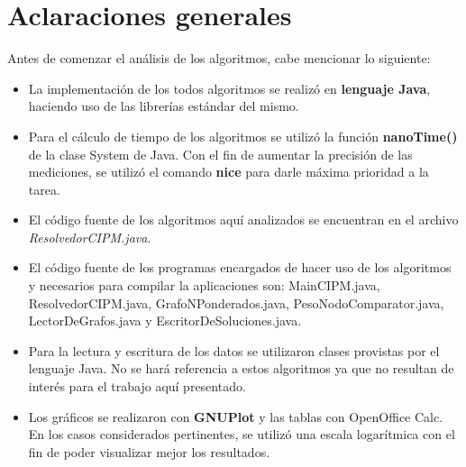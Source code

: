 \documentclass[a4paper,11pt] {article}
\begin{document}
\grupo{}

\maketitle

\bigskip
\section*{Aclaraciones generales}

Antes de comenzar el an\'alisis de los algoritmos, cabe mencionar lo siguiente:

\begin{itemize}
 \item La implementaci\'on de los todos algoritmos se realiz\'o en \textbf{lenguaje Java}, haciendo uso de las librer\'ias est\'andar del mismo.
 \item Para el c\'alculo de tiempo de los algoritmos se utiliz\'o la funci\'on \textbf{nanoTime()} de la clase System de Java. Con el fin de aumentar la precisi\'on de las mediciones, se utiliz\'o el comando \textbf{nice} para darle m\'axima prioridad a la tarea.
 \item El c\'odigo fuente de los algoritmos aqu\'i analizados se encuentran en el archivo \textit{ResolvedorCIPM.java}.
 \item El c\'odigo fuente de los programas encargados de hacer uso de los algoritmos y necesarios para compilar la aplicaciones son: MainCIPM.java, ResolvedorCIPM.java, GrafoNPonderados.java, PesoNodoComparator.java, LectorDeGrafos.java y EscritorDeSoluciones.java.
 \item Para la lectura y escritura de los datos se utilizaron clases provistas por el lenguaje Java. No se har\'a referencia a estos algoritmos ya que no resultan de inter\'es para el trabajo aqu\'i presentado.
 \item Los gr\'aficos se realizaron con \textbf{GNUPlot} y las tablas con OpenOffice Calc. En los casos considerados pertinentes, se utiliz\'o una escala logar\'itmica con el fin de poder visualizar mejor los resultados.
\end{itemize}
\end{document}
